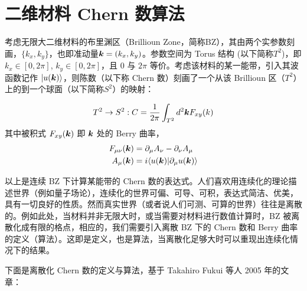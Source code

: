 
\chapter{二维材料 Chern 数算法}\label{sec:chern}

考虑无限大二维材料的布里渊区（Brillioun Zone，简称BZ），其由两个实参数刻画，$\{k_x, k_y\}$，也即准动量$\boldsymbol{k}=(k_x, k_y)$。参数空间为 Torus 结构 (以下简称$T^2$)，即 $k_x\in[0, 2\pi]$, $k_y\in[0, 2\pi]$，且 0 与 $2\pi$ 等价。考虑该材料的某一能带，引入其波函数记作 $|u(\boldsymbol{k})\rangle$，则陈数（以下称 Chern 数）刻画了一个从该 Brillioun 区（$T^2$）上的到一个球面（以下简称$S^2$）的映射：

\begin{align}
T^2 \rightarrow S^2 : C = \frac{1}{2\pi}\int_{T^2}d^2\boldsymbol{k} F_{xy}(k)
\end{align}
其中被积式 $F_{xy}(\boldsymbol{k})$ 即 $\boldsymbol{k}$ 处的 Berry 曲率，
\begin{align}
F_{\mu\nu}(\boldsymbol{k})&=\partial_{\mu}A_{\nu} - \partial_{\nu}A_{\mu} \\ 
A_{\mu}(\boldsymbol{k})&=i\langle u(\boldsymbol{k})|\partial_{\mu}u(\boldsymbol{k})\rangle
\end{align}

以上是连续 BZ 下计算某能带的 Chern 数的表达式。人们喜欢用连续化的理论描述世界（例如量子场论），连续化的世界可偏、可导、可积，表达式简洁、优美，具有一切良好的性质。然而真实世界（或者说人们可测、可算的世界）往往是离散的。例如此处，当材料并非无限大时，或当需要对材料进行数值计算时，BZ 被离散化成有限的格点，相应的，我们需要引入离散 BZ 下的 Chern 数和 Berry 曲率的定义（算法）。这即是定义，也是算法，当离散化足够大时可以重现出连续化情况下的结果。

下面是离散化 Chern 数的定义与算法，基于 Takahiro Fukui 等人 2005 年的文章：

